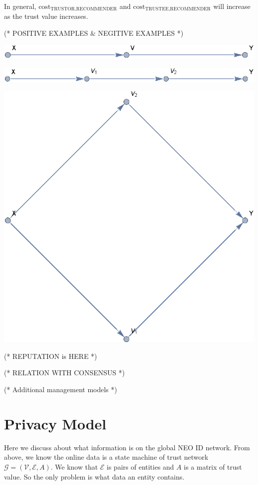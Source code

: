 \documentclass{article}
\begin{document}
In general, \(\text{cost}_{\text{TRUSTOR},\text{RECOMMENDER}}\) and \(\text{cost}_{\text{TRUSTEE},\text{RECOMMENDER}}\) will increase as the trust
value increases.

(* POSITIVE EXAMPLES $\&$ NEGITIVE EXAMPLES *)



\includegraphics{export_gr3.eps}



\includegraphics{export_gr4.eps}



\includegraphics{export_gr5.eps}

(* REPUTATION is HERE *)

(* RELATION WITH CONSENSUS *)

(* Additional management models *)


\section{Privacy Model}

Here we discuss about what information is on the global NEO ID network. From above, we know the online data is a state machine of trust network \(\mathcal{G}=(\mathcal{V},\mathcal{E},A)\).
We know that \(\mathcal{E}\) is pairs of entities and \(A\) is a matrix of trust value. So the only problem is what data an entity contains.
\end{document}
